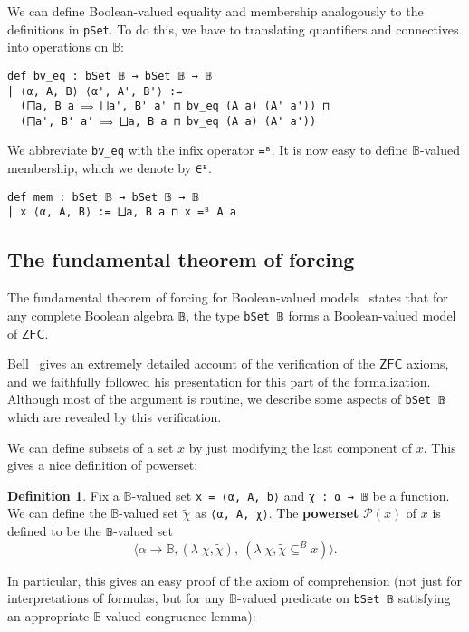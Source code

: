 \documentclass[sigplan,10pt,review, autoref,anonymous]{acmart}
\newcommand{\B}{\mathbb{B}}
\newcommand{\lil}{\lstinline}
\theoremstyle{definition}
\newtheorem{defn}{Definition}[section]
\begin{document}
We can define Boolean-valued equality and membership analogously to the definitions in \lil{pSet}.
To do this, we have to translating quantifiers and connectives into operations on $\B$:
\begin{lstlisting}
def bv_eq : bSet 𝔹 → bSet 𝔹 → 𝔹
| ⟨α, A, B⟩ ⟨α', A', B'⟩ :=
  (⨅a, B a ⟹ ⨆a', B' a' ⊓ bv_eq (A a) (A' a')) ⊓
  (⨅a', B' a' ⟹ ⨆a, B a ⊓ bv_eq (A a) (A' a'))
\end{lstlisting}

We abbreviate \lil{bv_eq} with the infix operator \lil{=ᴮ}.
It is now easy to define $\B$-valued membership, which we denote by \lil{∈ᴮ}.
\begin{lstlisting}
def mem : bSet 𝔹 → bSet 𝔹 → 𝔹
| x ⟨α, A, B⟩ := ⨆a, B a ⊓ x =ᴮ A a
\end{lstlisting}

\subsection{The fundamental theorem of forcing}
\label{subsection:bset:fundamental-thm}
The fundamental theorem of forcing for Boolean-valued models~\cite{hamkins2012well} states that for any complete Boolean algebra \lil{𝔹}, the type \lil{bSet 𝔹} forms a Boolean-valued model of $\mathsf{ZFC}$.

Bell~\cite{bell2011set} gives an extremely detailed account of the verification of the $\mathsf{ZFC}$ axioms,
and we faithfully followed his presentation for this part of the formalization.
Although most of the argument is routine, we describe some aspects of \lil{bSet 𝔹} which are revealed by this verification.

We can define subsets of a set $x$ by just modifying the last component of $x$.
This gives a nice definition of powerset:
\begin{defn} \label{def-powerset}
  Fix a $\B$-valued set \lil{x = ⟨α, A, b⟩} and \lil{χ : α → 𝔹} be a function.
  We can define the $\B$-valued set $\tilde{\chi}$ as \lil{⟨α, A, χ⟩}.
  The \textbf{powerset} $\mathcal{P}(x)$ of $x$ is defined to be the \lil{𝔹}-valued set
  \[\langle \alpha \to \B, (\lambda\; \chi, \widetilde{\chi}),\ (\lambda\;\chi, \tilde{\chi} \subseteq^B x)\rangle.\]
\end{defn}

In particular, this gives an easy proof of the axiom of comprehension (not just for interpretations of formulas, but for any \(\mathbb{B}\)-valued predicate on \lil{bSet 𝔹} satisfying an appropriate \(\mathbb{B}\)-valued congruence lemma):
\end{document}

